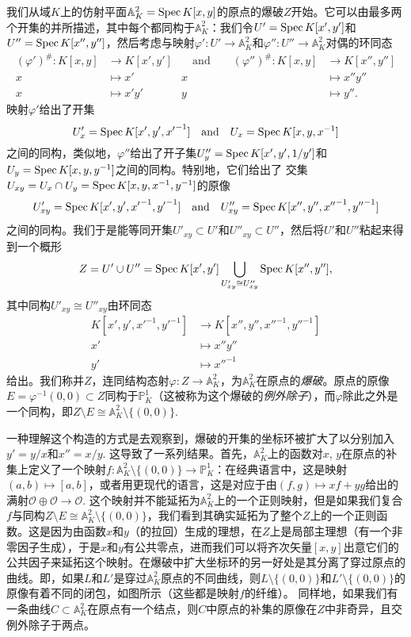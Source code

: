 \begin{exa}\label{exa:4.14}
	我们从域$K$上的仿射平面$\mathbb A_K^2=\operatorname{Spec} K[x,y]$的原点的爆破$Z$开始。它可以由最多两个开集的并所描述，其中每个都同构于$\mathbb A_K^2$：我们令$U'=\operatorname{Spec} K[x',y']$和$U''=\operatorname{Spec} K[x'',y'']$，然后考虑与映射$\varphi':U'\to \mathbb A_K^2$和$\varphi'':U''\to \mathbb A_K^2$对偶的环同态
	\[
	\begin{aligned}
		(\varphi')^\#:K[x,y]&\longrightarrow K[x',y']&\quad \text{and}\qquad (\varphi'')^\#:K[x,y]&\longrightarrow K[x'',y'']\\
		x&\longmapsto x'& x&\longmapsto x''y''\\
		x&\longmapsto x'y'& y&\longmapsto y''.
	\end{aligned}
	\]
	映射$\varphi'$给出了开集
	\[
	U'_x=\operatorname{Spec} K[x',y',{x'}^{-1}]\quad \text{and}\quad 
	U_x=\operatorname{Spec} K[x,y,x^{-1}]
	\]
	之间的同构，类似地，$\varphi''$给出了开子集$U''_y=\operatorname{Spec} K[x',y',1/y']$和$U_y=\operatorname{Spec} K[x,y,y^{-1}]$之间的同构。特别地，它们给出了
	交集$U_{xy}=U_x\cap U_y=\operatorname{Spec} K[x,y,x^{-1},y^{-1}]$的原像
	\[
	U'_{xy}=\operatorname{Spec} K[x',y',{x'}^{-1},{y'}^{-1}]\quad \text{and}\quad 
	U''_{xy}=\operatorname{Spec} K[x'',y'',{x''}^{-1},{y''}^{-1}]
	\]
	之间的同构。我们于是能等同开集$U'_{xy}\subset U'$和$U''_{xy}\subset U''$，然后将$U'$和$U''$粘起来得到一个概形
	\[
		Z=U'\cup U''=\operatorname{Spec} K[x',y']\bigcup_{U'_{xy}\cong U''_{xy}}\operatorname{Spec} K[x'',y''],
	\]
	其中同构$U'_{xy}\cong U''_{xy}$由环同态
	\[
	\begin{aligned}
		K[x',y',{x'}^{-1},{y'}^{-1}]&\longrightarrow 
		K[x'',y'',{x''}^{-1},{y''}^{-1}]\\
		x'&\longmapsto x''y''\\
		y'&\longmapsto {x''}^{-1}
	\end{aligned}
	\]
	给出。我们称并$Z$，连同结构态射$\varphi:Z\to \mathbb A_K^2$，为$\mathbb A_K^2$在原点的\textit{爆破}。原点的原像$E=\varphi^{-1}(0,0)\subset Z$同构于$\mathbb P_K^1$（这被称为这个爆破的\textit{例外除子}），而$\varphi$除此之外是一个同构，即$Z\setminus E\cong \mathbb A_K^2\setminus \{(0,0)\}$.
\end{exa}


一种理解这个构造的方式是去观察到，爆破的开集的坐标环被扩大了以分别加入$y'=y/x$和$x''=x/y$. 这导致了一系列结果。首先，$\mathbb A_K^2$上的函数对$x$, $y$在原点的补集上定义了一个映射$f:\mathbb A_K^2\setminus \{(0,0)\}\to \mathbb P_K^1$：在经典语言中，这是映射$(a,b)\mapsto [a,b]$，或者用更现代的语言，这是对应于由$(f,g)\mapsto xf+yg$给出的满射$\mathscr O\oplus \mathscr O\to \mathscr O$. 这个映射并不能延拓为$\mathbb A_K^2$上的一个正则映射，但是如果我们复合$f$与同构$Z\setminus E\cong \mathbb A_K^2\setminus \{(0,0)\}$，我们看到其确实延拓为了整个$Z$上的一个正则函数。这是因为由函数$x$和$y$（的拉回）生成的理想，在$Z$上是局部主理想（有一个非零因子生成），于是$x$和$y$有公共零点，进而我们可以将齐次矢量$[x,y]$出意它们的公共因子来延拓这个映射。在爆破中扩大坐标环的另一好处是其分离了穿过原点的曲线。即，如果$L$和$L'$是穿过$\mathbb A_K^2$原点的不同曲线，则$L\setminus \{(0,0)\}$和$L'\setminus \{(0,0)\}$的原像有着不同的闭包，如图所示（这些都是映射$f$的纤维）。
同样地，如果我们有一条曲线$C\subset \mathbb A_K^2$在原点有一个结点，则$C$中原点的补集的原像在$Z$中非奇异，且交例外除子于两点。

